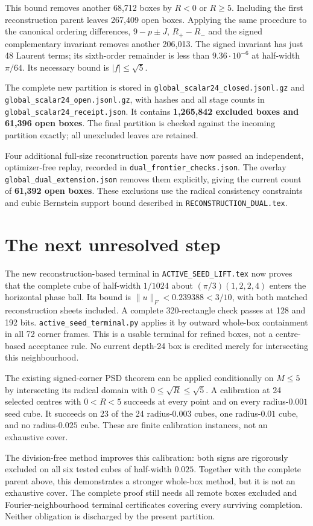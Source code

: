 \documentclass[11pt]{article}
\begin{document}
This bound removes another 68,712 boxes by $R<0$ or $R\ge5$.
Including the first reconstruction parent leaves 267,409 open boxes.
Applying the same procedure to the canonical ordering differences,
$9-p\pm J$, $R_+-R_-$ and the signed complementary invariant removes
another 206,013. The signed invariant has just 48 Laurent terms; its
sixth-order remainder is less than $9.36\cdot10^{-6}$ at half-width
$\pi/64$. Its necessary bound is $|f|\le\sqrt5$.

The complete new partition is stored in
\texttt{global\_scalar24\_closed.jsonl.gz} and
\texttt{global\_scalar24\_open.jsonl.gz}, with hashes and all stage
counts in \texttt{global\_scalar24\_receipt.json}. It contains
\textbf{1,265,842 excluded boxes and 61,396 open boxes}.
The final partition is checked against the incoming partition exactly;
all unexcluded leaves are retained.

Four additional full-size reconstruction parents have now passed an
independent, optimizer-free replay, recorded in
\texttt{dual\_frontier\_checks.json}. The overlay
\texttt{global\_dual\_extension.json} removes them explicitly, giving
the current count of \textbf{61,392 open boxes}. These exclusions use
the radical consistency constraints and cubic Bernstein support bound
described in \texttt{RECONSTRUCTION\_DUAL.tex}.

\section*{The next unresolved step}
The new reconstruction-based terminal in \texttt{ACTIVE\_SEED\_LIFT.tex}
now proves that the complete cube of half-width $1/1024$ about
$(\pi/3)(1,2,2,4)$ enters the horizontal phase ball. Its bound is
$\|u\|_F<0.239388<3/10$, with both matched reconstruction sheets
included. A complete 320-rectangle check passes at 128 and 192 bits.
\texttt{active\_seed\_terminal.py} applies it by outward whole-box
containment in all 72 corner frames. This is a usable terminal for
refined boxes, not a centre-based acceptance rule. No current depth-24
box is credited merely for intersecting this neighbourhood.

The existing signed-corner PSD theorem can be applied conditionally on
$M\le5$ by intersecting its radical domain with $0\le\sqrt R\le\sqrt5$.
A calibration at 24 selected centres with $0<R<5$ succeeds at every point
and on every radius-$0.001$ seed cube. It succeeds on 23 of the 24
radius-$0.003$ cubes, one radius-$0.01$ cube, and no radius-$0.025$ cube.
These are finite calibration instances, not an exhaustive cover.

The division-free method improves this calibration: both signs are
rigorously excluded on all six tested cubes of half-width $0.025$.
Together with the complete parent above, this demonstrates a stronger
whole-box method, but it is not an exhaustive cover. The complete proof
still needs all remote boxes excluded and Fourier-neighbourhood terminal
certificates covering every surviving completion. Neither obligation is
discharged by the present partition.
\end{document}
